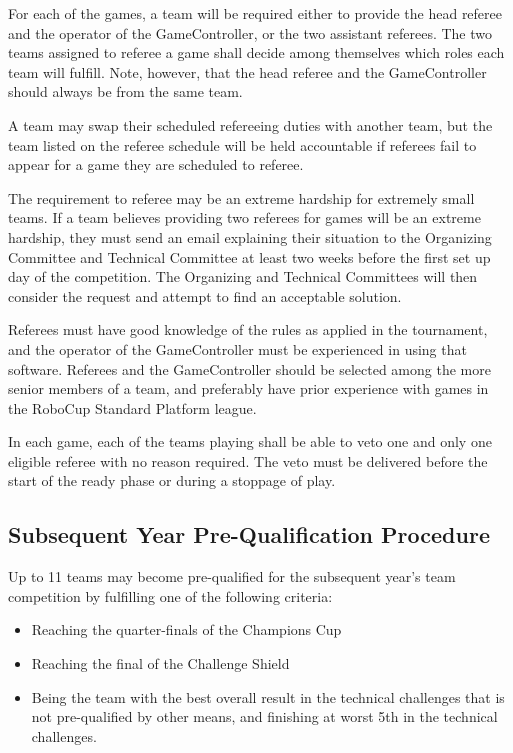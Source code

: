 For each of the games, a team will be required either to provide the head referee and the operator of the GameController, or the two assistant referees.  The two teams assigned to referee a game shall decide among themselves which roles each team will fulfill. Note, however, that the head referee and the GameController should always be from the same team.

A team may swap their scheduled refereeing duties with another team, but the team listed on the referee schedule will be held accountable if referees fail to appear for a game they are scheduled to referee.

The requirement to referee may be an extreme hardship for extremely small teams.  If a team believes providing two referees for games will be an extreme hardship, they must send an email explaining their situation to the Organizing Committee and Technical Committee at least two weeks before the first set up day of the competition.  The Organizing and Technical Committees will then consider the request and attempt to find an acceptable solution.

Referees must have good knowledge of the rules as applied in the tournament, and the operator of the GameController must be experienced in using that software. Referees and the GameController should be selected among the more senior members of a team, and preferably have prior experience with games in the RoboCup Standard Platform league.

In each game, each of the teams playing shall be able to veto one and only one eligible referee with no reason required. The veto must be delivered before the start of the ready phase or during a stoppage of play.


\subsection{Subsequent Year Pre-Qualification Procedure}
\label{sec:preQual}
Up to 11 teams may become pre-qualified for the subsequent year's team competition by fulfilling one of the following criteria:
\begin{itemize}
    \item Reaching the quarter-finals of the Champions Cup
    \item Reaching the final of the Challenge Shield
    \item Being the team with the best overall result in the technical challenges that is not pre-qualified by other means, and finishing at worst 5th in the technical challenges.
\end{itemize}

